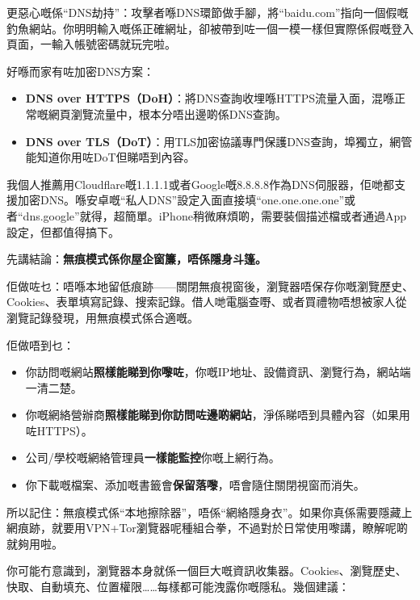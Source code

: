 更惡心嘅係“DNS劫持”：攻擊者喺DNS環節做手腳，將“baidu.com”指向一個假嘅釣魚網站。你明明輸入嘅係正確網址，卻被帶到咗一個一模一樣但實際係假嘅登入頁面，一輸入帳號密碼就玩完啦。

好喺而家有咗加密DNS方案：

\begin{itemize}
  \item \textbf{DNS over HTTPS（DoH）}：將DNS查詢收埋喺HTTPS流量入面，混喺正常嘅網頁瀏覽流量中，根本分唔出邊啲係DNS查詢。
  \item \textbf{DNS over TLS（DoT）}：用TLS加密協議專門保護DNS查詢，埠獨立，網管能知道你用咗DoT但睇唔到內容。
\end{itemize}

我個人推薦用Cloudflare嘅1.1.1.1或者Google嘅8.8.8.8作為DNS伺服器，佢哋都支援加密DNS。喺安卓嘅“私人DNS”設定入面直接填“one.one.one.one”或者“dns.google”就得，超簡單。iPhone稍微麻煩啲，需要裝個描述檔或者通過App設定，但都值得搞下。


先講結論：\textbf{無痕模式係你屋企窗簾，唔係隱身斗篷。}

佢做咗乜：唔喺本地留低痕跡——關閉無痕視窗後，瀏覽器唔保存你嘅瀏覽歷史、Cookies、表單填寫記錄、搜索記錄。借人哋電腦查嘢、或者買禮物唔想被家人從瀏覽記錄發現，用無痕模式係合適嘅。

佢做唔到乜：

\begin{itemize}
  \item 你訪問嘅網站\textbf{照樣能睇到你嚟咗}，你嘅IP地址、設備資訊、瀏覽行為，網站端一清二楚。
  \item 你嘅網絡營辦商\textbf{照樣能睇到你訪問咗邊啲網站}，淨係睇唔到具體內容（如果用咗HTTPS）。
  \item 公司/學校嘅網絡管理員\textbf{一樣能監控}你嘅上網行為。
  \item 你下載嘅檔案、添加嘅書籤會\textbf{保留落嚟}，唔會隨住關閉視窗而消失。
\end{itemize}

所以記住：無痕模式係“本地擦除器”，唔係“網絡隱身衣”。如果你真係需要隱藏上網痕跡，就要用VPN+Tor瀏覽器呢種組合拳，不過對於日常使用嚟講，瞭解呢啲就夠用啦。


你可能冇意識到，瀏覽器本身就係一個巨大嘅資訊收集器。Cookies、瀏覽歷史、快取、自動填充、位置權限……每樣都可能洩露你嘅隱私。幾個建議：

